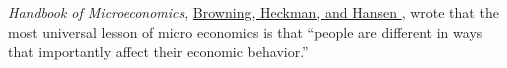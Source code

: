     \textit{Handbook of Microeconomics}, \href{http://larspeterhansen.org/wp-content/uploads/2016/11/Microdata-and-GE-Models.pdf}{Browning, Heckman, and Hansen \citeyear{browning_chapter_1999}}, wrote that the most universal lesson of micro economics is that ``people are different in ways that importantly affect their economic behavior.''
